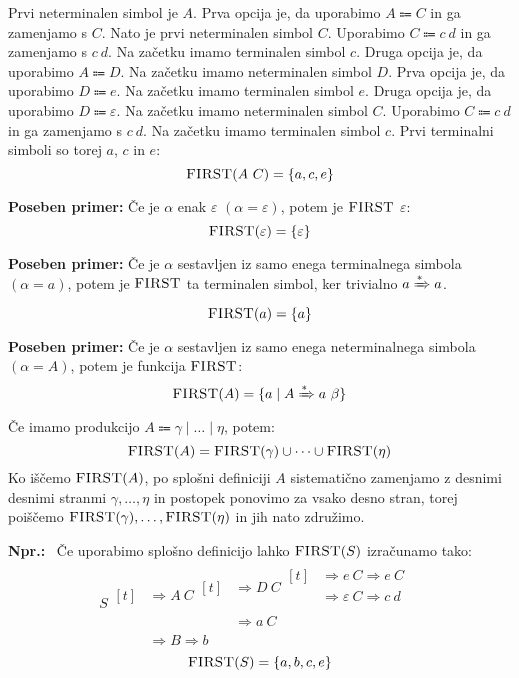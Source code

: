 \documentclass{article}
\newcommand{\Ex}{\textbf{Npr.:}\ }
\newcommand{\Special}[1]{\textbf{#1}}
\newcommand{\FIRST}{\textsc{FIRST}}
\newcommand{\Null}{\varepsilon}
\newcommand{\Arrow}{\Coloneqq}
\newcommand{\Derive}{\Rightarrow}
\newcommand{\DeriveStar}{\xRightarrow{\ast}}
\newcommand{\Seq}{\ }
\newcommand{\Union}{\mathrel{|}}
\begin{document}
Prvi neterminalen simbol je $A$.
Prva opcija je, da uporabimo $A \Arrow C$ in ga zamenjamo s $C$.
Nato je prvi neterminalen simbol $C$.
Uporabimo $C \Arrow c \Seq d$ in ga zamenjamo s $c \Seq d$.
Na začetku imamo terminalen simbol $c$.
Druga opcija je, da uporabimo $A \Arrow D$.
Na začetku imamo neterminalen simbol $D$.
Prva opcija je, da uporabimo $D \Arrow e$.
Na začetku imamo terminalen simbol $e$.
Druga opcija je, da uporabimo $D \Arrow \Null$.
Na začetku imamo neterminalen simbol $C$.
Uporabimo $C \Arrow c \Seq d$ in ga zamenjamo s $c \Seq d$.
Na začetku imamo terminalen simbol $c$.
Prvi terminalni simboli so torej $a$, $c$ in $e$:
\begin{equation*}
  \FIRST(A \Seq C) = \{a, c, e\}
\end{equation*}

\Special{Poseben primer:} Če je $\alpha$ enak $\Null$ ${(\alpha = \Null)}$, potem je $\FIRST$ $\Null$:
\begin{equation*}
  \FIRST(\Null) = \{ \Null \}
\end{equation*}

\Special{Poseben primer:} Če je $\alpha$ sestavljen iz samo enega terminalnega simbola ${(\alpha = a)}$, potem je $\FIRST$ ta terminalen simbol, ker trivialno $a \DeriveStar a$.
\begin{equation*}
  \FIRST(a) = \{ a \}
\end{equation*}

\Special{Poseben primer:} Če je $\alpha$ sestavljen iz samo enega neterminalnega simbola ${(\alpha = A)}$, potem je funkcija $\FIRST$:
\begin{equation*}
  \FIRST(A) = \{ a \mid A \DeriveStar a \Seq \beta \}
\end{equation*}
Če imamo produkcijo $A \Arrow \gamma \Union \dots \Union \eta$, potem:
\begin{equation*}
  \FIRST(A) = \FIRST(\gamma) \cup \dots \cup \FIRST(\eta)
\end{equation*}
Ko iščemo $\FIRST(A)$, po splošni definiciji $A$ sistematično zamenjamo z desnimi desnimi stranmi $\gamma, \dots, \eta$ in postopek ponovimo za vsako desno stran, torej poiščemo $\FIRST(\gamma), \dots, \FIRST(\eta)$ in jih nato združimo.

\Ex
Če uporabimo splošno definicijo lahko $\FIRST(S)$ izračunamo tako:
\begin{equation*}
  S \begin{aligned}[t]
    &\Derive A \Seq C \begin{aligned}[t]
      &\Derive D \Seq C \begin{aligned}[t]
        &\Derive e \Seq C \Derive e \Seq C \\
        &\Derive \Null \Seq C \Derive c \Seq d \\
      \end{aligned}\\
      &\Derive a \Seq C
    \end{aligned}\\
  &\Derive B \Derive b
  \end{aligned}
\end{equation*}
\begin{equation*}
  \FIRST(S) = \{a, b, c, e\}
\end{equation*}
\end{document}
